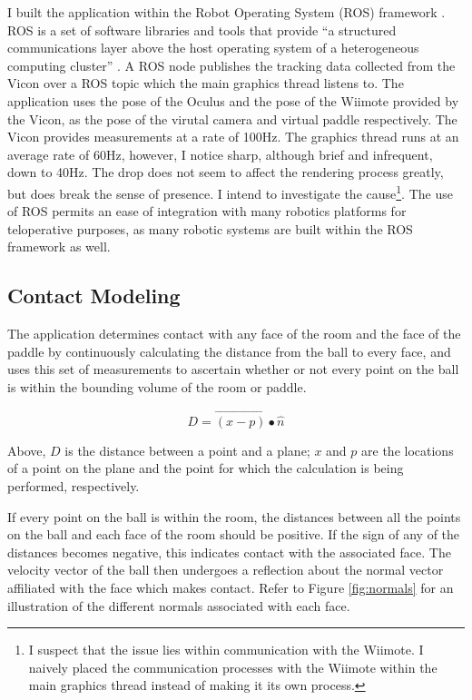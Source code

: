 I built the application within the Robot Operating System (ROS) framework
\cite{website:ros}. ROS is a set of software libraries and tools that provide
``a structured communications layer above the host operating system of a
heterogeneous computing cluster'' \cite{quigley2009ros}. A ROS node publishes
the tracking data collected from the Vicon over a ROS topic which the main
graphics thread listens to. The application uses the pose of the Oculus and the
pose of the Wiimote provided by the Vicon, as the pose of the virutal camera
and virtual paddle respectively. The Vicon provides measurements at a rate of
100Hz. The graphics thread runs at an average rate of 60Hz, however, I notice
sharp, although brief and infrequent, down to 40Hz. The drop does not seem to
affect the rendering process greatly, but does break the sense of presence.  I
intend to investigate the cause\footnote{I suspect that the issue lies within
    communication with the Wiimote. I naively placed the communication
processes with the Wiimote within the main graphics thread instead of making it
its own process.}. The use of ROS permits an ease of integration with many
robotics platforms for teloperative purposes, as many robotic systems are built
within the ROS framework as well.

\subsection{Contact Modeling}

The application determines contact with any face of the room and the face of
the paddle by continuously calculating the distance from the ball to every
face, and uses this set of measurements to ascertain whether or not every point
on the ball is within the bounding volume of the room or paddle.  

\[
D = \vec{(x - p)} \bullet \hat{n}
\]

Above, $D$ is the distance between a point and a plane; $x$ and $p$ are
the locations of a point on the plane and the point for which the calculation
is being performed, respectively.
\smallskip

If every point on the ball is within the room, the distances between all the
points on the ball and each face of the room should be positive.  If the sign
of any of the distances becomes negative, this indicates contact with the
associated face. The velocity vector of the ball then undergoes a reflection
about the normal vector affiliated with the face which makes contact.  Refer to
Figure \ref{fig:normals} for an illustration of the different normals
associated with each face.


